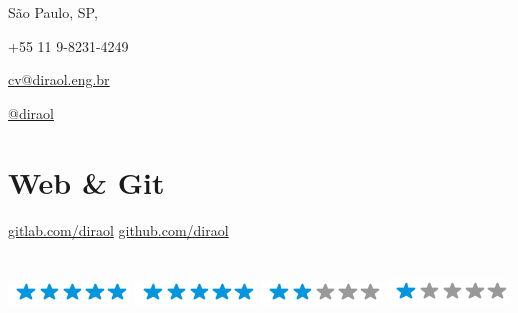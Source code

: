 \documentclass[]{friggeri-cv}
\begin{document}
\thispagestyle{empty}
%
%

%
%
\begin{asidefp}
  \section{}
    \raggedright%
    \pin{} São Paulo, SP, %

    {\Large\textcolor{gray}{\Mobilefone}} +55 11 9-{}8231-{}4249%

    {\Large\textcolor{gray}{\Letter}} \href{mailto:cv@diraol.eng.br}{cv@diraol.eng.br}%

    \tlogo{} \href{https://twitter.com/diraol}{@diraol}%

    \llogo{} %

  \raggedleft%
  \section{Web \& Git}
    \href{https://gitlab.com/diraol}{gitlab.com/diraol}
    \href{https://github.com/diraol}{github.com/diraol}
%
  \section{}
    \textbf{}\includegraphics[scale=0.40]{img/5stars.png}
    \textbf{}\includegraphics[scale=0.40]{img/5stars.png}
    \textbf{}\includegraphics[scale=0.40]{img/2stars.png}
    \textbf{}\includegraphics[scale=0.40]{img/1stars.png}
\end{asidefp}
\end{document}
